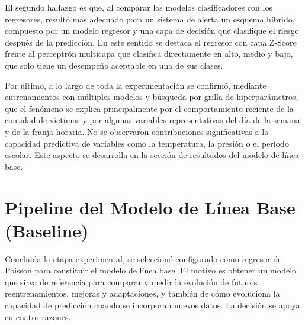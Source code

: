 El segundo hallazgo es que, al comparar los modelos clasificadores con los regresores, resultó más adecuado para un sistema de alerta un esquema híbrido, compuesto por un modelo regresor y una capa de decisión que clasifique el riesgo después de la predicción. En este sentido se destaca el \xgboost{} regresor con capa Z-Score frente al perceptrón multicapa que clasifica directamente en alto, medio y bajo, que solo tiene un desempeño aceptable en una de sus clases.

Por último, a lo largo de toda la experimentación se confirmó, mediante entrenamientos con múltiples modelos y búsqueda por grilla de hiperparámetros, que el fenómeno se explica principalmente por el comportamiento reciente de la cantidad de víctimas y por algunas variables representativas del día de la semana y de la franja horaria. No se observaron contribuciones significativas a la capacidad predictiva de variables como la temperatura, la presión o el período escolar. Este aspecto se desarrolla en la sección de resultados del modelo de línea base.

\section{Pipeline del Modelo de Línea Base (Baseline)}\label{pipeline-del-modelo-de-luxednea-base-baseline}

Concluida la etapa experimental, se seleccionó \xgboost{} configurado como regresor de Poisson para constituir el modelo de línea base. El motivo es obtener un modelo que sirva de referencia para comparar y medir la evolución de futuros reentrenamientos, mejoras y adaptaciones, y también de cómo evoluciona la capacidad de predicción cuando se incorporan nuevos datos. La decisión se apoya en cuatro razones.

